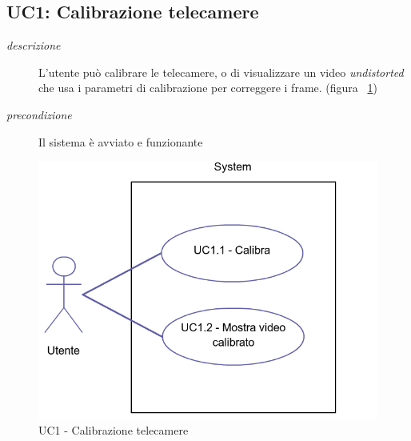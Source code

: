\subsection{UC1: Calibrazione telecamere}
\begin{description}
 \item[\em{descrizione}] L'utente può calibrare le telecamere, o di visualizzare un video \textit{undistorted} che usa i parametri di calibrazione per correggere i frame. (figura ~\ref{fig:uc1})
 \item[\em{precondizione}] Il sistema è avviato e funzionante \end{description}
\begin{figure}[htpb]
\centering
\includegraphics[scale=0.4]{./images/uc1.png}
\caption{UC1 - Calibrazione telecamere}
\label{fig:uc1}
\end{figure} 

